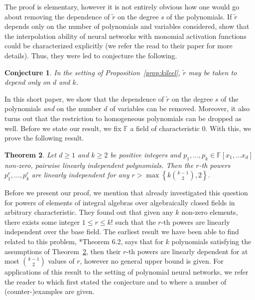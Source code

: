 \documentclass{amsart}
\newtheorem{theorem}{Theorem}
\newtheorem{conjecture}[theorem]{Conjecture}
\theoremstyle{definition}
\theoremstyle{remark}
\numberwithin{equation}{section}
\newcommand{\F}{\mathbb{F}}
\begin{document}
The proof is elementary, however it is not entirely obvious how one would go
about removing the dependence of $ \tilde{r} $ on the degree $ s $ of the
polynomials. If $ \tilde{r} $ depends only on the number of polynomials and
variables considered, \cite{Kileel19} show that the interpolation ability of
neural networks with monomial activation functions could be characterized explicitly
(we refer the read to their paper for more details). Thus, they were led to
conjecture the following.

\begin{conjecture}
	\label{conj:kileel}
	In the setting of Proposition~\ref{prop:kileel}, $ \tilde{r} $ may be taken
	to depend only on $ d $ and $ k $.
\end{conjecture}

In this short paper, we show that the dependence of $ \tilde{r} $ on the degree
$ s $ of the polynomials \emph{and} on the number $ d $ of variables can be
removed. Moreover, it also turns out that the restriction to homogeneous
polynomials can be dropped as well. Before we state our result, we fix $ \F $ a field of
characteristic $ 0 $. With this, we prove the following result.

\begin{theorem}
	\label{thm:main}
	Let $ d\geq1 $ and $ k\geq2 $ be positive integers and $ p_1, \ldots, p_k
	\in \F[x_1, \ldots x_d] $ non-zero, pairwise linearly independent
	polynomials. Then the $ r $-th powers $ p_1^r, \ldots, p_k^r $ are linearly
	independent for any $ r > \max\left\{k \binom{k-1}{2},2\right\} $.
\end{theorem}

Before we present our proof, we mention that \cite{Sam19} already investigated
this question for powers of elements of integral algebras over algebraically
closed fields in arbitrary characteristic. They found out that given any $ k $
non-zero elements, there exists some integer $ 1 \leq r \leq k! $ such that the
$ r $-th powers are linearly independent over the base field. The earliest result
we have been able to find related to this problem, \cite{Bisht17}*{Theorem 6.2}, says
that for $ k $ polynomials satisfying the assumptions of Theorem~\ref{thm:main},
then their $ r $-th powers are linearly dependent for at most $ 
\binom{k-1}{2} $ values of $ r $, however no general upper bound is given. For
applications of this result to the setting of polynomial neural networks, we
refer the reader to \cite{Kileel19} which first stated the conjecture and to
\cite{Kubjas24} where a number of (counter-)examples are given.
\end{document}
